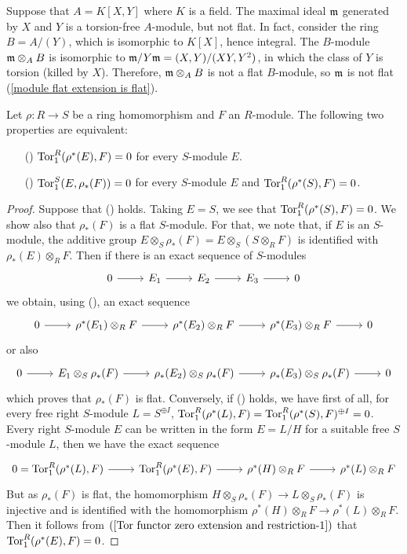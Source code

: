 \begin{example}
Suppose that $A=K[X,Y]$ where $K$ is a field. The maximal ideal $\mathfrak{m}$ generated by $X$ and $Y$ is a torsion-free $A$-module, but not flat. In fact, consider the ring $B=A/(Y)$, which is isomorphic to $K[X]$, hence integral. The $B$-module $\mathfrak{m}\otimes_AB$ is isomorphic to $\mathfrak{m}/Y\mathfrak{m}=(X,Y)/(XY,Y^2)$, in which the class of $Y$ is torsion (killed by $X$). Therefore, $\mathfrak{m}\otimes_AB$ is not a flat $B$-module, so $\mathfrak{m}$ is not flat (\cref{module flat extension is flat}). 
\end{example}
\begin{proposition}\label{Tor functor zero extension and restriction}
Let $\rho:R\to S$ be a ring homomorphism and $F$ an $R$-module. The following two properties are equivalent:
\begin{itemize}
\item[(\rmnum{1})] $\mathrm{Tor}_1^R(\rho^*(E),F)=0$ for every $S$-module $E$.
\item[(\rmnum{2})] $\mathrm{Tor}_1^S(E,\rho_*(F))=0$ for every $S$-module $E$ and $\mathrm{Tor}_1^R(\rho^*(S),F)=0$.
\end{itemize}
\end{proposition}
\begin{proof}
Suppose that () holds. Taking $E=S$, we see that $\mathrm{Tor}_1^R(\rho^*(S),F)=0$. We show also that $\rho_*(F)$ is a flat $S$-module. For that, we note that, if $E$ is an $S$-module, the additive group $E\otimes_S\rho_*(F)=E\otimes_S(S\otimes_RF)$ is identified with $\rho_*(E)\otimes_RF$. Then if there is an exact sequence of $S$-modules
\[\begin{tikzcd}[row sep=5pt]
0\ar[r]&E_1\ar[r]&E_2\ar[r]&E_3\ar[r]&0
\end{tikzcd}\]
we obtain, using (), an exact sequence
\[\begin{tikzcd}[row sep=5pt]
0\ar[r]&\rho^*(E_1)\otimes_RF\ar[r]&\rho^*(E_2)\otimes_RF\ar[r]&\rho^*(E_3)\otimes_RF\ar[r]&0
\end{tikzcd}\]
or also
\[\begin{tikzcd}
0\ar[r]&E_1\otimes_S\rho_*(F)\ar[r]&\rho_*(E_2)\otimes_S\rho_*(F)\ar[r]&\rho_*(E_3)\otimes_S\rho_*(F)\ar[r]&0
\end{tikzcd}\]
which proves that $\rho_*(F)$ is flat. Conversely, if () holds, we have first of all, for every free right $S$-module $L=S^{\oplus I}$, $\mathrm{Tor}_1^R(\rho^*(L),F)=\mathrm{Tor}_1^R(\rho^*(S),F)^{\oplus I}=0$. Every right $S$-module $E$ can be written in the form $E=L/H$ for a suitable free $S$-module $L$, then we have the exact sequence
\begin{equation}\label{Tor functor zero extension and restriction-1}
\begin{tikzcd}
0=\Tor_1^R(\rho^*(L),F)\ar[r]&\Tor_1^R(\rho^*(E),F)\ar[r]&\rho^*(H)\otimes_RF\ar[r]&\rho^*(L)\otimes_RF
\end{tikzcd}
\end{equation}
But as $\rho_*(F)$ is flat, the homomorphism $H\otimes_S\rho_*(F)\to L\otimes_S\rho_*(F)$ is injective and is identified with the homomorphism $\rho^*(H)\otimes_RF\to\rho^*(L)\otimes_RF$. Then it follows from $(\ref{Tor functor zero extension and restriction-1})$ that $\mathrm{Tor}_1^R(\rho^*(E),F)=0$.
\end{proof}
